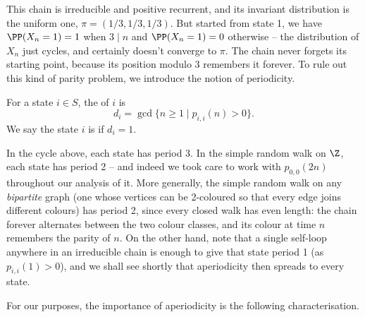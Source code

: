 \documentclass[a4paper]{scrartcl}
\begin{document}
This chain is irreducible and positive recurrent, and its invariant distribution is the uniform one, $\pi = (1/3, 1/3, 1/3)$. But started from state 1, we have $\PP(X_n = 1) = 1$ when $3 \mid n$ and $\PP(X_n = 1) = 0$ otherwise -- the distribution of $X_n$ just cycles, and certainly doesn't converge to $\pi$. The chain never forgets its starting point, because its position modulo 3 remembers it forever. To rule out this kind of parity problem, we introduce the notion of periodicity.

\begin{definition}[Period]
	For a state $i \in S$, the  of $i$ is
	$$
	d_i = \gcd\{n \geq 1 \mid p_{i, i}(n) > 0\}.
	$$
	We say the state $i$ is  if $d_i = 1$.
\end{definition}

In the cycle above, each state has period 3. In the simple random walk on $\Z$, each state has period 2 -- and indeed we took care to work with $p_{0,0}(2n)$ throughout our analysis of it. More generally, the simple random walk on any \emph{bipartite} graph (one whose vertices can be 2-coloured so that every edge joins different colours) has period 2, since every closed walk has even length: the chain forever alternates between the two colour classes, and its colour at time $n$ remembers the parity of $n$. On the other hand, note that a single self-loop anywhere in an irreducible chain is enough to give that state period 1 (as $p_{i,i}(1) > 0$), and we shall see shortly that aperiodicity then spreads to every state.

For our purposes, the importance of aperiodicity is the following characterisation.
\end{document}
